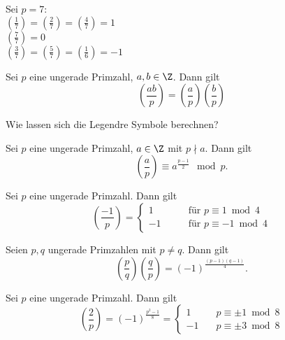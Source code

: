 \begin{exmp*}
	Sei $p=7$:\\
	\( \left( \frac{1}{7} \right) = \left( \frac{2}{7} \right) = \left( \frac{4}{7} \right) = 1 \)\\
	\( \left( \frac{7}{7} \right) = 0 \)\\
	\( \left( \frac{3}{7} \right) = \left( \frac{5}{7} \right) = \left( \frac{1}{6} \right) = -1 \)
\end{exmp*}

\begin{thm}\autolabel
	Sei $p$ eine ungerade Primzahl, $a,b\in \Z$. Dann gilt
	\[ \left( \frac{ab}{p} \right) = \left( \frac{a}{p} \right) \left( \frac{b}{p} \right) \]
\end{thm}

\begin{frage*}
	Wie lassen sich die Legendre Symbole berechnen?
\end{frage*}

\begin{thm}[Euler]\autolabel
	Sei $p$ eine ungerade Primzahl, $a \in \Z$ mit $p \nmid a$. Dann gilt
	\[ \left( \frac{a}{p} \right) \equiv a^{\frac{p-1}{2}} \mod p. \]
\end{thm}

\begin{cor}\autolabel
	Sei $p$ eine ungerade Primzahl. Dann gilt
	\[ \left( \frac{-1}{p} \right) = \begin{cases}
		1 \qquad &\text{für $p \equiv 1 \bmod 4$}\\
		-1 \qquad &\text{für $p \equiv -1 \bmod 4$}
	\end{cases} \]
\end{cor}

\begin{thm}\autolabel
	Seien $p,q$ ungerade Primzahlen mit $p \neq q$. Dann gilt
	\[ \left( \frac{p}{q} \right) \left( \frac{q}{p} \right) = (-1)^{\frac{(p-1)(q-1)}{4}}. \]
\end{thm}

\begin{thm}\autolabel
	Sei $p$ eine ungerade Primzahl. Dann gilt
	\[ \left( \frac{2}{p} \right) = (-1)^{\frac{p^2-1}{8}} = \begin{cases}
		1 \quad &p \equiv \pm 1 \bmod 8\\
		-1 \quad &p \equiv \pm 3 \bmod 8
	\end{cases} \]
\end{thm}

